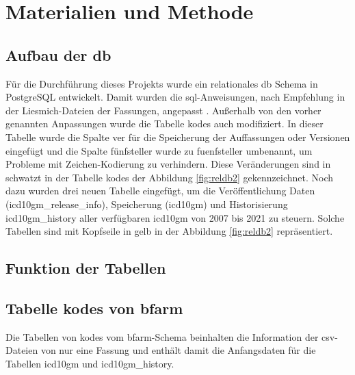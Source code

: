\chapter{Materialien und Methode} \label{database}

\section{Aufbau der \acl{db}} \label{dbdevelop}

Für die Durchführung dieses Projekts wurde ein relationales \ac{db} Schema in PostgreSQL entwickelt. Damit wurden die \ac{sql}-Anweisungen, nach Empfehlung in der Liesmich-Dateien der Fassungen, angepasst \cite{readmel}. Außerhalb von den vorher genannten Anpassungen wurde die Tabelle \textsf{kodes} auch modifiziert. In dieser Tabelle wurde die Spalte \textsf{ver} für die Speicherung der Auffassungen oder Versionen eingefügt und die Spalte \textsf{fünfsteller} wurde zu \textsf{fuenfsteller} umbenannt, um Probleme mit Zeichen-Kodierung zu verhindern. Diese Veränderungen sind in schwatzt in der Tabelle \textsf{kodes} der Abbildung \ref{fig:reldb2} gekennzeichnet. Noch dazu wurden drei neuen Tabelle eingefügt, um die Veröffentlichung Daten (\textsf{icd10gm\_release\_info}), Speicherung (\textsf{icd10gm}) und Historisierung \textsf{icd10gm\_history} aller verfügbaren \ac{icd10gm} von 2007 bis 2021 zu steuern. Solche Tabellen sind mit Kopfseile in gelb in der Abbildung \ref{fig:reldb2} repräsentiert.

\section{Funktion der Tabellen}

\section{Tabelle \textsf{kodes} von \acs{bfarm}} \label{bfarmtables}

Die Tabellen von \textsf{kodes} vom \ac{bfarm}-Schema beinhalten die Information der \ac{csv}-Dateien von nur eine Fassung und enthält damit die Anfangsdaten für die Tabellen \textsf{icd10gm} und \textsf{icd10gm\_history}.

